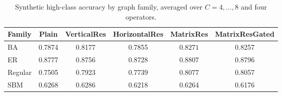 \begin{table}[!htbp]
\centering
\scriptsize
\caption{Synthetic high-class accuracy by graph family, averaged over \(C=4,\ldots,8\) and four operators.}
\label{tab:synthetic_distribution_high_class}
\begin{tabular}{l c c c c c}
\toprule
Family & Plain & VerticalRes & HorizontalRes & MatrixRes & MatrixResGated \\
\midrule
BA & 0.7874 & 0.8177 & 0.7855 & \(\mathbf{0.8271}\) & 0.8257 \\
ER & 0.8777 & 0.8756 & 0.8728 & \(\mathbf{0.8807}\) & 0.8796 \\
Regular & 0.7505 & 0.7923 & 0.7739 & \(\mathbf{0.8077}\) & 0.8057 \\
SBM & 0.6268 & \(\mathbf{0.6286}\) & 0.6218 & 0.6264 & 0.6176 \\
\bottomrule
\end{tabular}
\end{table}
 